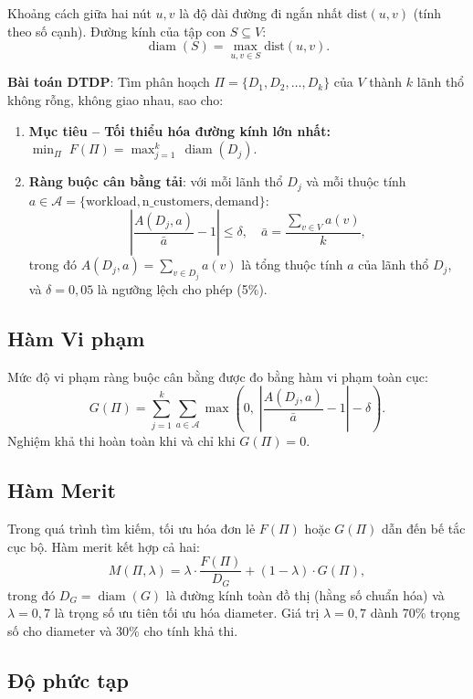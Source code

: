 \documentclass[12pt, a4paper]{article}
\begin{document}
Khoảng cách giữa hai nút $u, v$ là độ dài đường đi ngắn nhất $\text{dist}(u,v)$
(tính theo số cạnh). Đường kính của tập con $S \subseteq V$:
\[
  \operatorname{diam}(S) = \max_{u,v \in S} \text{dist}(u,v).
\]

\textbf{Bài toán DTDP}: Tìm phân hoạch $\Pi = \{D_1, D_2, \ldots, D_k\}$ của $V$
thành $k$ lãnh thổ không rỗng, không giao nhau, sao cho:

\begin{enumerate}
  \item \textbf{Mục tiêu -- Tối thiểu hóa đường kính lớn nhất:}
        $\displaystyle\min_{\Pi}\; F(\Pi) = \max_{j=1}^{k}\,\operatorname{diam}(D_j).$

  \item \textbf{Ràng buộc cân bằng tải}: với mỗi lãnh thổ $D_j$ và mỗi thuộc
        tính $a \in \mathcal{A} = \{\text{workload}, \text{n\_customers}, \text{demand}\}$:
        \[
          \left|\frac{A(D_j, a)}{\bar{a}} - 1\right| \leq \delta,
          \quad \bar{a} = \frac{\sum_{v \in V} a(v)}{k},
        \]
        trong đó $A(D_j, a) = \sum_{v \in D_j} a(v)$ là tổng thuộc tính $a$
        của lãnh thổ $D_j$, và $\delta = 0{,}05$ là ngưỡng lệch cho phép (5\%).
\end{enumerate}

\subsection{Hàm Vi phạm}

Mức độ vi phạm ràng buộc cân bằng được đo bằng hàm vi phạm toàn cục:
\[
  G(\Pi) = \sum_{j=1}^{k} \sum_{a \in \mathcal{A}}
           \max\!\left(0,\; \left|\frac{A(D_j, a)}{\bar{a}} - 1\right| - \delta\right).
\]
Nghiệm khả thi hoàn toàn khi và chỉ khi $G(\Pi) = 0$.

\subsection{Hàm Merit}

Trong quá trình tìm kiếm, tối ưu hóa đơn lẻ $F(\Pi)$ hoặc $G(\Pi)$ dẫn đến
bế tắc cục bộ. Hàm merit kết hợp cả hai:
\[
  M(\Pi, \lambda) = \lambda \cdot \frac{F(\Pi)}{D_G} + (1-\lambda) \cdot G(\Pi),
\]
trong đó $D_G = \operatorname{diam}(G)$ là đường kính toàn đồ thị (hằng số
chuẩn hóa) và $\lambda = 0{,}7$ là trọng số ưu tiên tối ưu hóa diameter.
Giá trị $\lambda = 0{,}7$ dành 70\% trọng số cho diameter và 30\% cho tính khả thi.

\subsection{Độ phức tạp}
\end{document}
